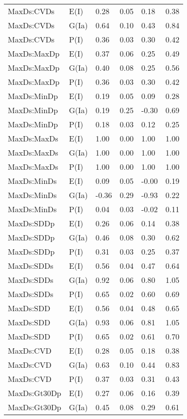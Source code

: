 \begin{center}
\begin{longtable}{|p{1.1in}|p{0.7in}|p{0.7in}|p{0.6in}|p{0.6in}|p{0.6in}|}
  MaxDs:CVDs & E(I) & 0.28 & 0.05 & 0.18 & 0.38 \\ 
  MaxDs:CVDs & G(Ia) & 0.64 & 0.10 & 0.43 & 0.84 \\ 
  MaxDs:CVDs & P(I) & 0.36 & 0.03 & 0.30 & 0.42 \\ 
  MaxDs:MaxDp & E(I) & 0.37 & 0.06 & 0.25 & 0.49 \\ 
  MaxDs:MaxDp & G(Ia) & 0.40 & 0.08 & 0.25 & 0.56 \\ 
  MaxDs:MaxDp & P(I) & 0.36 & 0.03 & 0.30 & 0.42 \\ 
  MaxDs:MinDp & E(I) & 0.19 & 0.05 & 0.09 & 0.28 \\ 
  MaxDs:MinDp & G(Ia) & 0.19 & 0.25 & -0.30 & 0.69 \\ 
  MaxDs:MinDp & P(I) & 0.18 & 0.03 & 0.12 & 0.25 \\ 
  MaxDs:MaxDs & E(I) & 1.00 & 0.00 & 1.00 & 1.00 \\ 
  MaxDs:MaxDs & G(Ia) & 1.00 & 0.00 & 1.00 & 1.00 \\ 
  MaxDs:MaxDs & P(I) & 1.00 & 0.00 & 1.00 & 1.00 \\ 
  MaxDs:MinDs & E(I) & 0.09 & 0.05 & -0.00 & 0.19 \\ 
  MaxDs:MinDs & G(Ia) & -0.36 & 0.29 & -0.93 & 0.22 \\ 
  MaxDs:MinDs & P(I) & 0.04 & 0.03 & -0.02 & 0.11 \\ 
  MaxDs:SDDp & E(I) & 0.26 & 0.06 & 0.14 & 0.38 \\ 
  MaxDs:SDDp & G(Ia) & 0.46 & 0.08 & 0.30 & 0.62 \\ 
  MaxDs:SDDp & P(I) & 0.31 & 0.03 & 0.25 & 0.37 \\ 
  MaxDs:SDDs & E(I) & 0.56 & 0.04 & 0.47 & 0.64 \\ 
  MaxDs:SDDs & G(Ia) & 0.92 & 0.06 & 0.80 & 1.05 \\ 
  MaxDs:SDDs & P(I) & 0.65 & 0.02 & 0.60 & 0.69 \\ 
  MaxDs:SDD & E(I) & 0.56 & 0.04 & 0.48 & 0.65 \\ 
  MaxDs:SDD & G(Ia) & 0.93 & 0.06 & 0.81 & 1.05 \\ 
  MaxDs:SDD & P(I) & 0.65 & 0.02 & 0.61 & 0.70 \\ 
  MaxDs:CVD & E(I) & 0.28 & 0.05 & 0.18 & 0.38 \\ 
  MaxDs:CVD & G(Ia) & 0.63 & 0.10 & 0.44 & 0.83 \\ 
  MaxDs:CVD & P(I) & 0.37 & 0.03 & 0.31 & 0.43 \\ 
  MaxDs:Gt30Dp & E(I) & 0.27 & 0.06 & 0.16 & 0.39 \\ 
  MaxDs:Gt30Dp & G(Ia) & 0.45 & 0.08 & 0.29 & 0.61 \\ 

\end{longtable}
\end{center}
